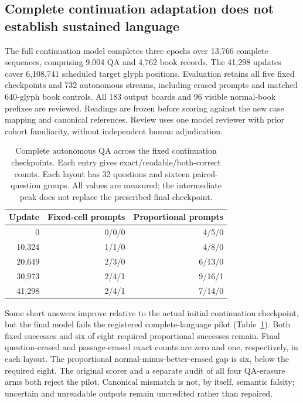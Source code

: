 \subsection*{Complete continuation adaptation does not establish sustained language}
The full continuation model completes three epochs over 13,766 complete
sequences, comprising 9,004 QA and 4,762 book records. The 41,298 updates cover
6,108,741 scheduled target glyph positions. Evaluation retains all five fixed
checkpoints and 732 autonomous streams, including erased prompts and matched
640-glyph book controls. All 183 output boards and 96 visible normal-book
prefixes are reviewed. Readings are frozen before scoring against the new
case mapping and canonical references. Review uses one model reviewer with
prior cohort familiarity, without independent human adjudication.

\begin{table}[t]
\centering
\caption{Complete autonomous QA across the fixed continuation checkpoints.
Each entry gives exact/readable/both-correct counts. Each layout has 32
questions and sixteen paired-question groups. All values are measured;
the intermediate peak does not replace the prescribed final checkpoint.}
\label{tab:complete-continuation-checkpoints}
\begin{tabular}{rrr}
\hline
Update & Fixed-cell prompts & Proportional prompts \\
\hline
0 & 0/0/0 & 4/5/0 \\
10,324 & 1/1/0 & 4/8/0 \\
20,649 & 2/3/0 & 6/13/0 \\
30,973 & 2/4/1 & 9/16/1 \\
41,298 & 2/4/1 & 7/14/0 \\
\hline
\end{tabular}
\end{table}

Some short answers improve relative to the actual initial continuation
checkpoint, but the final model fails the registered complete-language pilot
(Table~\ref{tab:complete-continuation-checkpoints}). Both fixed successes and
six of eight required proportional successes remain. Final question-erased
and passage-erased exact counts are zero and one, respectively, in each layout.
The proportional normal-minus-better-erased gap is six, below the required
eight. The original scorer and a separate audit of all four QA-erasure arms
both reject the pilot. Canonical mismatch is not, by itself, semantic falsity;
uncertain and unreadable outputs remain uncredited rather than repaired.

